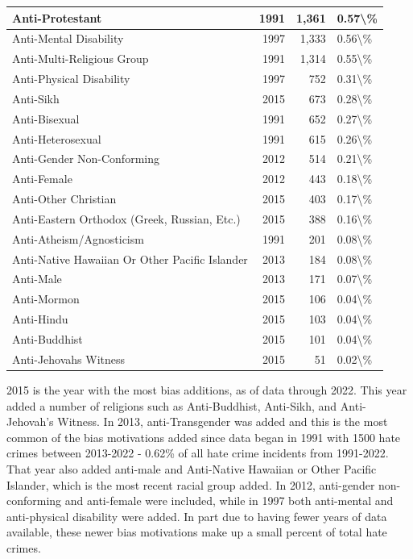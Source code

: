\documentclass[
]{krantz}
\begin{document}
\begin{longtable}[t]{l|r|r|l}
\hline
Anti-Protestant & 1991 & 1,361 & 0.57\textbackslash{}\%\\
\hline
Anti-Mental Disability & 1997 & 1,333 & 0.56\textbackslash{}\%\\
\hline
Anti-Multi-Religious Group & 1991 & 1,314 & 0.55\textbackslash{}\%\\
\hline
Anti-Physical Disability & 1997 & 752 & 0.31\textbackslash{}\%\\
\hline
Anti-Sikh & 2015 & 673 & 0.28\textbackslash{}\%\\
\hline
Anti-Bisexual & 1991 & 652 & 0.27\textbackslash{}\%\\
\hline
Anti-Heterosexual & 1991 & 615 & 0.26\textbackslash{}\%\\
\hline
Anti-Gender Non-Conforming & 2012 & 514 & 0.21\textbackslash{}\%\\
\hline
Anti-Female & 2012 & 443 & 0.18\textbackslash{}\%\\
\hline
Anti-Other Christian & 2015 & 403 & 0.17\textbackslash{}\%\\
\hline
Anti-Eastern Orthodox (Greek, Russian, Etc.) & 2015 & 388 & 0.16\textbackslash{}\%\\
\hline
Anti-Atheism/Agnosticism & 1991 & 201 & 0.08\textbackslash{}\%\\
\hline
Anti-Native Hawaiian Or Other Pacific Islander & 2013 & 184 & 0.08\textbackslash{}\%\\
\hline
Anti-Male & 2013 & 171 & 0.07\textbackslash{}\%\\
\hline
Anti-Mormon & 2015 & 106 & 0.04\textbackslash{}\%\\
\hline
Anti-Hindu & 2015 & 103 & 0.04\textbackslash{}\%\\
\hline
Anti-Buddhist & 2015 & 101 & 0.04\textbackslash{}\%\\
\hline
Anti-Jehovahs Witness & 2015 & 51 & 0.02\textbackslash{}\%\\
\hline
\end{longtable}

2015 is the year with the most bias additions, as of data
through 2022. This year added a number of religions such as
Anti-Buddhist, Anti-Sikh, and Anti-Jehovah's Witness. In
2013, anti-Transgender was added and this is the most common
of the bias motivations added since data began in 1991 with
1500 hate crimes between 2013-2022 - 0.62\% of all hate
crime incidents from 1991-2022. That year also added
anti-male and Anti-Native Hawaiian or Other Pacific
Islander, which is the most recent racial group added. In
2012, anti-gender non-conforming and anti-female were
included, while in 1997 both anti-mental and anti-physical
disability were added. In part due to having fewer years of
data available, these newer bias motivations make up a small
percent of total hate crimes.
\end{document}
